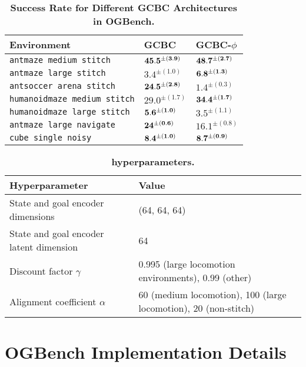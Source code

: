 \begin{table}[htb!]
\caption{\textbf{Success Rate for Different GCBC Architectures in OGBench.}}
\label{table:phi}
\begin{center}
\begin{tabular}{l|ll}
    \toprule
    Environment & \textbf{GCBC} & \textbf{GCBC-$\phi$} \\
    \midrule
    \texttt{antmaze medium stitch} & $\bf45.5^{\pm(3.9)}$ & $\bf48.7^{\pm(2.7)}$ \\
    \texttt{antmaze large stitch} & $3.4^{\pm(1.0)}$  & $\bf6.8^{\pm(1.3)}$ \\
    \texttt{antsoccer arena stitch} & $\bf24.5^{\pm(2.8)}$ & $1.4^{\pm(0.3)}$ \\
    \texttt{humanoidmaze medium stitch} & $29.0^{\pm(1.7)}$ &$\bf34.4^{\pm(1.7)}$ \\
    \texttt{humanoidmaze large stitch} & $\bf5.6^{\pm(1.0)}$ & $3.5^{\pm(1.1)}$ \\
    \midrule
    \texttt{antmaze large navigate} &$\bf24^{\pm(0.6)}$ & $16.1^{\pm(0.8)}$ \\
    \texttt{cube single noisy} &{$\bf8.4^{\pm(1.0)}$} &$\bf8.7^{\pm(0.9)}$ \\
    \bottomrule
\end{tabular}
\end{center}
\end{table}

\begin{table}[htb!]
\caption{\textbf{\Method{} hyperparameters.}}
\label{table:hyp}
\begin{center}
\small
\begin{tabular}{ll}
    \toprule
    \textbf{Hyperparameter} & \textbf{Value} \\
    \midrule
    State and goal encoder dimensions & (64, 64, 64) \\
    State and goal encoder latent dimension & 64 \\
    Discount factor $\gamma$ & 0.995 (large locomotion environments), 0.99 (other) \\
    Alignment coefficient $\alpha$ & 60 (medium locomotion), 100 (large locomotion), 20 (non-stitch) \\
    \bottomrule
\end{tabular}
\end{center}
\end{table}

\section{OGBench Implementation Details}\label{app:OGB}

